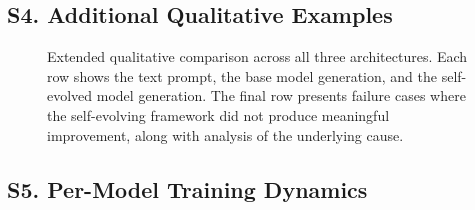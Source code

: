

\subsection*{S4. Additional Qualitative Examples}
\label{sec:sup_additional_qualitative}


\begin{figure}[tb]
  \centering
  \caption{Extended qualitative comparison across all three architectures. Each row shows the text prompt, the base model generation, and the self-evolved model generation. The final row presents failure cases where the self-evolving framework did not produce meaningful improvement, along with analysis of the underlying cause.}
  \label{fig:sup_qualitative}
\end{figure}


\subsection*{S5. Per-Model Training Dynamics}
\label{sec:sup_per_model_dynamics}


